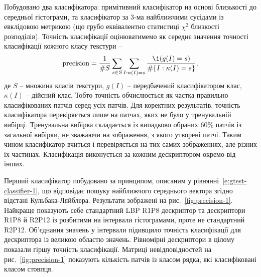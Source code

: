 Побудовано два класифікатора: примітивний класифікатор на основі близькості до середньої гістограми, 
та класифікатор за 3-ма найближчими сусідами із евклідовою метрикою (що грубо еквівалентно статистиці $\chi^2$ близкості розподілів).
Точність класифікації оцінюватимемо як середнє значення точності класифікації кожного класу текстури --
\begin{equation*}
    \text{precision} = \frac{1}{\# S} \sum_{s \in S} \sum_{I : \kappa(I) = s} \frac{\1(g(I) = s)}{\# \{I : \kappa(I) = s\}},
\end{equation*}
де $S$ -- множина класів текстури, $g(I)$ -- передбачений класифікатором клас, $\kappa(I)$ -- дійсний клас. 
Тобто точність обчислюється як частка правильно класифікованих патчів серед усіх патчів.
Для коректних результатів, точність класифікатора перевіряється лише на патчах, яких не було у тренувальній вибірці.
Тренувальна вибірка складається із випадково обраних 60\% патчів із загальної вибірки, не зважаючи на зображення, з якого утворені патчі.
Таким чином класифікатор вчиться і перевіряється на тих самих зображеннях, але різних їх частинах.
Класифікація виконується за кожним дескриптором окремо від інших.

Перший класифікатор побудовано за принципом, описаним у рівнянні~\eqref{e:gtest-classifier-1}, 
що відповідає пошуку найближчого середнього вектора згідно відстані Кульбака-Ляйблера.
Результати зображені на рис.~\ref{fig:precision-1}.
Найкраще показують себе стандартний LBP R1P8 дескриптор та дескриптори R1P8 й R2P12 із розбитими на інтервали гістограмами, проте не стандартний R2P12.
Об'єднання значень у інтервали підивщило точність класифікації для дескриптора із великою областю значень.
Рівномірні дескриптори в цілому показали гіршу точність класифікації.
Матриці невідповідностей на рис.~\ref{fig:precision-1} показують кількість патчів із класом рядка, які класифіковані класом стовпця. 

